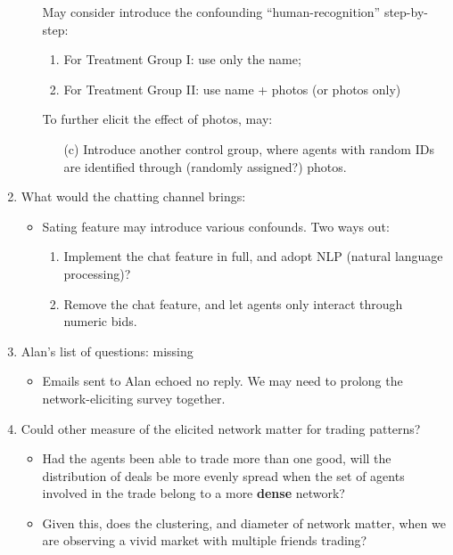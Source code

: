 \documentclass{article}
\begin{document}
\begin{enumerate}
\begin{itemize}
                May consider introduce the confounding ``human-recognition''
                step-by-step:
                \begin{enumerate}
                    \item For Treatment Group I: use only the name;
                    \item For Treatment Group II: use name + photos (or photos
                        only)
                \end{enumerate}
                To further elicit the effect of photos, may:
                \begin{itemize}
                    \item[(c)] Introduce another control group, where agents with
                        random IDs are identified through (randomly assigned?)
                        photos.
                \end{itemize}
        \end{itemize}
    \item What would the chatting channel brings:
        \begin{itemize}
            \item Sating feature may introduce various confounds. Two ways out:
                \begin{enumerate}
                    \item Implement the chat feature in full, and adopt NLP
                        (natural language processing)?
                    \item Remove the chat feature, and let agents only interact
                        through numeric bids.
                \end{enumerate}
        \end{itemize}
    \item Alan's list of questions: missing
        \begin{itemize}
            \item Emails sent to Alan echoed no reply. We may need to prolong
                the network-eliciting survey together.
        \end{itemize}
    \item Could other measure of the elicited network matter for trading
        patterns?
        \begin{itemize}
            \item Had the agents been able to trade more than one good, will the
                distribution of deals be more evenly spread when the set of
                agents involved in the trade belong to a more \textbf{dense}
                network?
            \item Given this, does the clustering, and diameter of network
                matter, when we are observing a vivid market with multiple
                friends trading?
        \end{itemize}
\end{enumerate}




%
%
%
\end{document}
